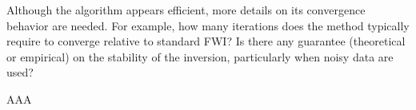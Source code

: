 \begin{point}
	Although the algorithm appears efficient, more details on its convergence behavior are needed. For example, how many iterations does the method typically require to converge relative to standard FWI? Is there any guarantee (theoretical or empirical) on the stability of the inversion, particularly when noisy data are used?
\end{point}

\begin{reply}
	AAA
\end{reply}

